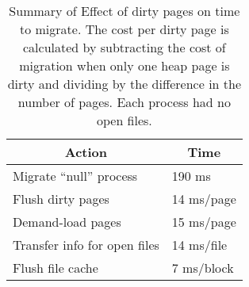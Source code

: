  \begin{table}[h]
 \begin{center}
 \begin{tabular} {|l|l|}
	 \hline
	 \hline
    \multicolumn{1}{|c|}{Action} &
    \multicolumn{1}{c|}{Time} \\
	 \hline
Migrate ``null'' process & 190 ms \\
Flush dirty pages & 14 ms/page \\
Demand-load pages & 15 ms/page \\
Transfer info for open files & 14 ms/file \\
Flush file cache & 7 ms/block \\
	 \hline
	 \hline
 \end{tabular}
 \caption{Summary of Effect of dirty  pages on time to migrate.  The cost per
 dirty page is calculated by subtracting the cost of migration when
 only one heap  page is dirty
  and dividing by the difference in the
 number of pages. Each process had no open files.
}
 \label{paging}
 \end{center}
 \end{table}

